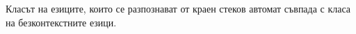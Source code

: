   
\begin{framed}
\begin{thm}
  \label{th:push-down-context-free}
  Класът на езиците, които се разпознават от краен стеков автомат съвпада с
  класа на безконтекстните езици.
\end{thm}
\end{framed}


